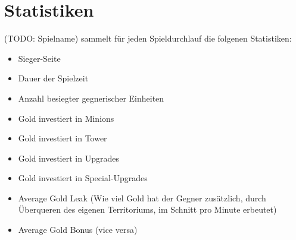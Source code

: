 \section{Statistiken}

%
%

(TODO: Spielname) sammelt für jeden Spieldurchlauf die folgenen Statistiken:
\begin{itemize}
	\item Sieger-Seite
	\item Dauer der Spielzeit
	\item Anzahl besiegter gegnerischer Einheiten
	\item Gold investiert in Minions
	\item Gold investiert in Tower
	\item Gold investiert in Upgrades
	\item Gold investiert in Special-Upgrades
	\item Average Gold Leak (Wie viel Gold hat der Gegner zusätzlich, durch Überqueren des eigenen Territoriums, im Schnitt pro Minute erbeutet)
	\item Average Gold Bonus (vice versa)
\end{itemize}


